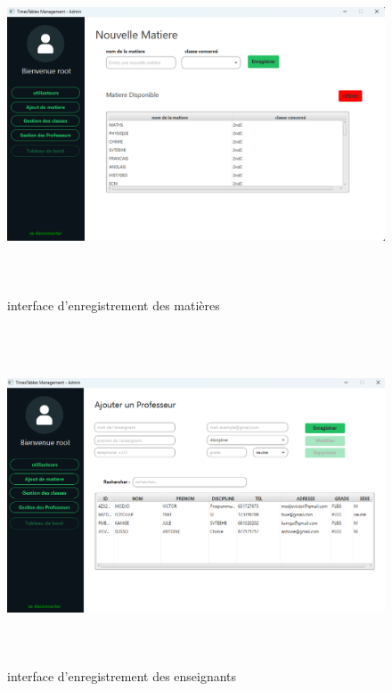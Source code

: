 \documentclass[english,12pt,a4paper]{report}
\begin{document}
\begin{figure}[h]
	\centering
	\includegraphics*[height=10cm, width=12cm]{enregistrementMatiere.png}
	\caption{interface d'enregistrement des matières}
	\label{fig13: enregistrementMatiere}
\end{figure} 

\begin{figure}[h]
	\centering
	\includegraphics*[height=10cm, width=12cm]{enregistrementProfesseur.png}
	\caption{interface d'enregistrement des enseignants}
	\label{fig14: enregistrementProfesseur}
\end{figure} 
\clearpage
\end{document}
